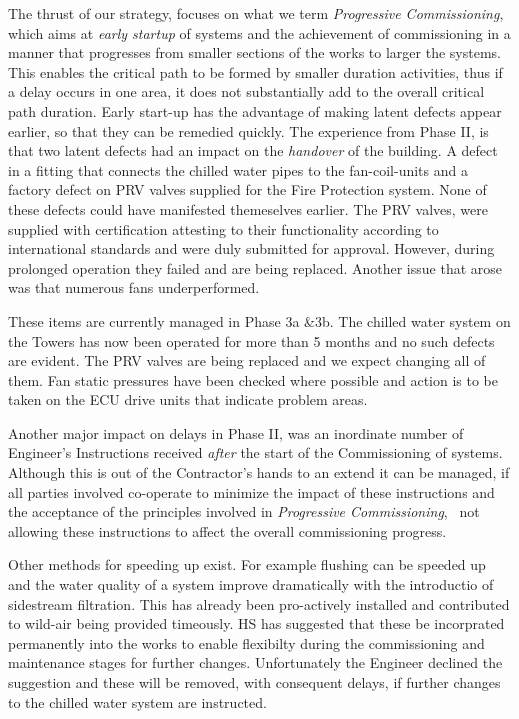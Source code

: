 The thrust of our strategy, focuses on what we term \textit{Progressive Commissioning}, which aims at \textit{early startup} of systems and the achievement of commissioning in a manner that progresses from smaller sections of the works to larger the systems. This enables the critical path to be formed by smaller duration activities, thus if a delay occurs in one area, it does not substantially add to the overall critical path duration. Early start-up has the advantage of making latent defects appear earlier, so that they can be remedied quickly. The experience from Phase II, is that two latent defects had an impact on the \textit{handover} of the building. A defect in a fitting that connects the chilled water pipes to the fan-coil-units and a factory defect on PRV valves supplied for the Fire Protection system. None of these defects could have manifested themeselves earlier. The PRV valves, were supplied with certification attesting to their functionality according to international standards and were duly submitted for approval. However, during prolonged operation they failed and are being replaced. Another issue that arose was that numerous fans underperformed.

These items are currently managed in Phase 3a \&3b. The chilled water system on the Towers has now been operated for more than 5 months and no such defects are evident. The PRV valves are being replaced and we expect changing all of them. Fan static pressures have been checked where possible and action is to be taken on the ECU drive units that indicate problem areas.

Another major impact on delays in Phase II, was an inordinate number of Engineer's Instructions received \textit{after} the start of the Commissioning of systems.
Although this is out of the Contractor's hands to an extend it can be managed, if all parties involved co-operate to minimize the impact of these instructions and the acceptance of the principles involved in \textit{Progressive Commissioning}, \ie\ not allowing these instructions to affect the overall commissioning progress. 


Other methods for speeding up exist. For example flushing can be speeded up and the water quality of a system improve dramatically with the introductio of sidestream filtration. This has already been pro-actively installed and contributed to wild-air being provided timeously. HS has suggested that these be incorprated permanently into the works to enable flexibilty during the commissioning and maintenance stages for further changes. Unfortunately the Engineer declined the suggestion and these will be removed, with consequent delays, if further changes to the chilled water system are instructed.

